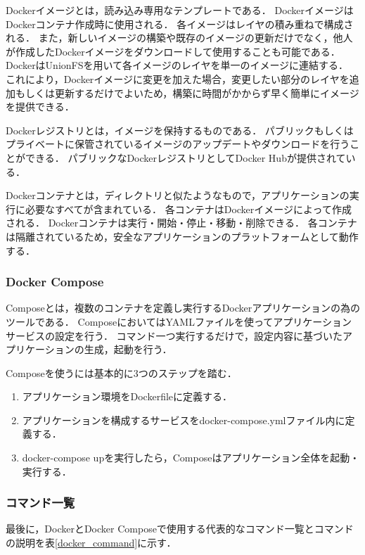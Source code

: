 Dockerイメージとは，読み込み専用なテンプレートである．
DockerイメージはDockerコンテナ作成時に使用される．
各イメージはレイヤの積み重ねで構成される．
また，新しいイメージの構築や既存のイメージの更新だけでなく，他人が作成したDockerイメージをダウンロードして使用することも可能である．
DockerはUnionFS\cite{Unionfs}を用いて各イメージのレイヤを単一のイメージに連結する．
これにより，Dockerイメージに変更を加えた場合，変更したい部分のレイヤを追加もしくは更新するだけでよいため，構築に時間がかからず早く簡単にイメージを提供できる．

Dockerレジストリとは，イメージを保持するものである．
パブリックもしくはプライベートに保管されているイメージのアップデートやダウンロードを行うことができる．
パブリックなDockerレジストリとしてDocker Hub\cite{dockerhub}が提供されている．

Dockerコンテナとは，ディレクトリと似たようなもので，アプリケーションの実行に必要なすべてが含まれている．
各コンテナはDockerイメージによって作成される．
Dockerコンテナは実行・開始・停止・移動・削除できる．
各コンテナは隔離されているため，安全なアプリケーションのプラットフォームとして動作する．


\subsubsection{Docker Compose}
Composeとは，複数のコンテナを定義し実行するDockerアプリケーションの為のツールである．
ComposeにおいてはYAML\cite{YAML}ファイルを使ってアプリケーションサービスの設定を行う．
コマンド一つ実行するだけで，設定内容に基づいたアプリケーションの生成，起動を行う．

Composeを使うには基本的に3つのステップを踏む．

\begin{enumerate}
    \item アプリケーション環境をDockerfileに定義する．
    \item アプリケーションを構成するサービスをdocker-compose.ymlファイル内に定義する．
    \item docker-compose upを実行したら，Composeはアプリケーション全体を起動・実行する．
\end{enumerate}

\newpage
\subsubsection{コマンド一覧}
最後に，DockerとDocker Composeで使用する代表的なコマンド一覧とコマンドの説明を表\ref{docker_command}に示す．



